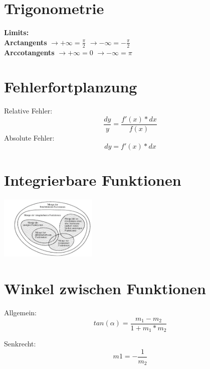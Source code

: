 \documentclass{article}
\begin{document}
\section{Trigonometrie}
\textbf{Limits:} \\
\textbf{Arctangents} $\rightarrow +\infty = \frac{\pi}{2}$ $\rightarrow -\infty = - \frac{\pi}{2}$ \\
\textbf{Arccotangents} $\rightarrow +\infty = 0$ $\rightarrow -\infty = {\pi}$ 
\newpage
\section{Fehlerfortplanzung}
Relative Fehler:
\begin{equation*}
    \frac{dy}{y} = \frac{f'(x) * dx}{f(x)} 
\end{equation*}
Absolute Fehler:
\begin{equation*}
    dy = f'(x)*dx
\end{equation*}
\section{Integrierbare Funktionen}
\begin{center}
    \includegraphics[width=0.35\textwidth]{MengenIntegral.PNG}
\end{center}
\section{Winkel zwischen Funktionen}
\begin{multicols}{2}
\begin{center}
    Allgemein:
\begin{equation*}
    tan(\alpha) =\frac{m_1 - m_2}{1 + m_1 * m_2}
\end{equation*}
\end{center}
\columnbreak
\begin{center}
    Senkrecht:
\begin{equation*}
    m1 = -\frac{1}{m_2}
\end{equation*}
\end{center}
\end{multicols}
\end{document}
